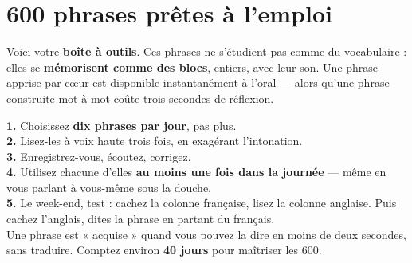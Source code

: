 \chapter{600 phrases prêtes à l'emploi}

Voici votre \textbf{boîte à outils}. Ces phrases ne s'étudient pas comme du vocabulaire :
elles se \textbf{mémorisent comme des blocs}, entiers, avec leur son. Une phrase apprise
par c\oe ur est disponible instantanément à l'oral --- alors qu'une phrase construite mot à
mot coûte trois secondes de réflexion.

\begin{regle}
\textbf{1.} Choisissez \textbf{dix phrases par jour}, pas plus.\\
\textbf{2.} Lisez-les à voix haute trois fois, en exagérant l'intonation.\\
\textbf{3.} Enregistrez-vous, écoutez, corrigez.\\
\textbf{4.} Utilisez chacune d'elles \textbf{au moins une fois dans la journée} --- même en
vous parlant à vous-même sous la douche.\\
\textbf{5.} Le week-end, test : cachez la colonne française, lisez la colonne anglaise.
Puis cachez l'anglais, dites la phrase en partant du français.\\
Une phrase est « acquise » quand vous pouvez la dire en moins de deux secondes, sans
traduire. Comptez environ \textbf{40 jours} pour maîtriser les 600.
\end{regle}

